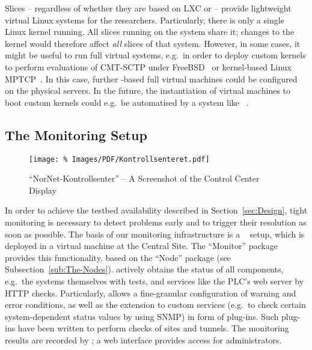 Slices -- regardless of whether they are based on LXC or  -- provide lightweight virtual Linux systems for the researchers. Particularly, there is only a single Linux kernel running. All slices running on the system share it; changes to the kernel would therefore affect \emph{all} slices of that system. However, in some cases, it might be useful to run full virtual systems, e.g.\ in order to deploy custom kernels to perform evaluations of CMT-SCTP under FreeBSD~\cite{Dre2012,PAMS2012} or kernel-based Linux MPTCP~\cite{RBP+11}. In this case, further -based full virtual machines could be configured on the physical servers. In the future, the instantiation of virtual machines to boot custom kernels could e.g.\ be automatised by a system like ~\cite{SHG+11}.


\subsection{The Monitoring Setup}
\label{sub:The-Monitoring-Setup}

\begin{figure*}
\begin{center}
\texttt{[image: \%
   Images/PDF/Kontrollsenteret.pdf]}
\end{center}
\caption{``NorNet-Kontrollsenter'' -- A Screenshot of the Control Center Display}
\label{cap:Kontrollsenteret}
\end{figure*}

In order to achieve the testbed availability described in Section~\ref{sec:Design}, tight monitoring is necessary to detect problems early and to trigger their resolution as soon as possible. The basis of our monitoring infrastructure is a ~\cite{NagiosCoreDocumentation} setup, which is deployed in a virtual machine at the Central Site. The ``Monitor'' package provides this functionality, based on the ``Node'' package (see Subsection~\ref{sub:The-Nodes}).  actively obtains the status of all components, e.g.\ the systems themselves with  tests, and services like the PLC's web server by HTTP checks. Particularly,  allows a fine-granular configuration of warning and error conditions, as well as the extension to custom services (e.g.\ to check certain system-dependent status values by using SNMP) in form of plug-ins. Such plug-ins have been written to perform checks of sites and tunnels. The monitoring results are recorded by ; a web interface provides access for administrators.

